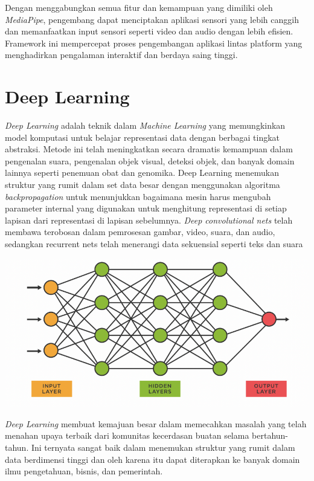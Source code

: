 Dengan menggabungkan semua fitur dan kemampuan yang dimiliki oleh \textit{MediaPipe}, pengembang dapat menciptakan aplikasi sensori yang lebih canggih dan memanfaatkan input sensori seperti video dan audio dengan lebih efisien. Framework ini mempercepat proses pengembangan aplikasi lintas platform yang menghadirkan pengalaman interaktif dan berdaya saing tinggi. \cite{singh2021real}

\section{Deep Learning}
\textit{Deep Learning} adalah teknik dalam \textit{Machine Learning} yang memungkinkan model komputasi untuk belajar representasi data dengan berbagai tingkat abstraksi. Metode ini telah meningkatkan secara dramatis kemampuan dalam pengenalan suara, pengenalan objek visual, deteksi objek, dan banyak domain lainnya seperti penemuan obat dan genomika. Deep Learning menemukan struktur yang rumit dalam set data besar dengan menggunakan algoritma \textit{backpropagation} untuk menunjukkan bagaimana mesin harus mengubah parameter internal yang digunakan untuk menghitung representasi di setiap lapisan dari representasi di lapisan sebelumnya. \textit{Deep convolutional nets} telah membawa terobosan dalam pemrosesan gambar, video, suara, dan audio, sedangkan recurrent nets telah menerangi data sekuensial seperti teks dan suara \cite{patterson2017deep}

\begin{center}
	\includegraphics[width=1.0\linewidth]{gambar/bener/ArsitekturDeeplearning.png}
	\label{fig:Deep Learning secara umum}
\end{center}  

\textit{Deep Learning} membuat kemajuan besar dalam memecahkan masalah yang telah menahan upaya terbaik dari komunitas kecerdasan buatan selama bertahun-tahun. Ini ternyata sangat baik dalam menemukan struktur yang rumit dalam data berdimensi tinggi dan oleh karena itu dapat diterapkan ke banyak domain ilmu pengetahuan, bisnis, dan pemerintah. \cite{deng2014deep}

